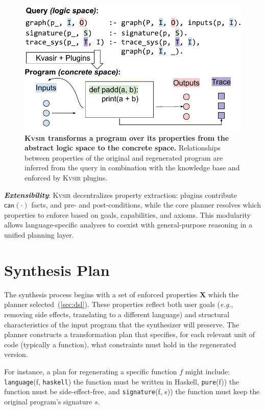 \documentclass[nonacm,sigplan,review]{acmart}
\def\eg{{\em e.g.}, }
\newcommand{\sys}{{\scshape Kv{\textalpha}sir}\xspace}
\newcommand{\heading}[1]{\vspace{2pt}\noindent\textbf{\emph{#1}}:\enspace}
\begin{document}
\begin{figure}[t]
\centering
  \includegraphics[width=.9\columnwidth]{figs/kvasir_logic-space.pdf}
  \caption{\textbf{\sys transforms a program over its properties from the abstract logic space to the concrete space.}
  Relationships between properties of the original and regenerated program are inferred 
  from the query in combination with the knowledge base and enforced by \sys plugins.
  }
  \label{fig:logic-to-concrete}
\end{figure}


\heading{Extensibility}
\sys decentralizes property extraction: plugins contribute $\mathsf{can}(\cdot)$ facts, and pre- and post-conditions, while the core planner resolves which properties to enforce based on goals, capabilities, and axioms.
This modularity allows language-specific analyses to coexist with general-purpose reasoning in a unified planning layer.

\section{Synthesis Plan}
\label{sec:synthesis}

The synthesis process begins with a set of enforced properties $\mathbf{X}$
which the planner selected~(\cref{sec:dsl}).
These properties
reflect both user goals (\eg removing side effects, translating to a
different language) and structural characteristics of the input program that
the synthesizer will preserve.
The planner constructs a transformation plan that
specifies, for each relevant unit of code (typically a function), what
constraints must hold in the regenerated version.

For instance, a plan for regenerating a specific function $f$ might include:
\texttt{language}(f, \texttt{haskell}) the function must be written in Haskell, 
\texttt{pure}(f)) the function must be side-effect-free, and 
\texttt{signature}(f, s)) the function must keep the original program's signature $s$.
\end{document}
